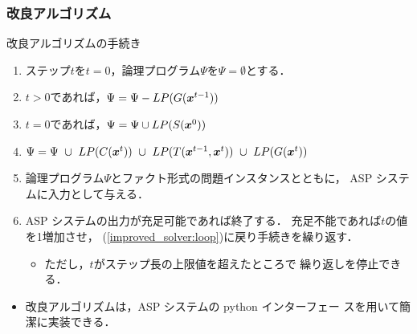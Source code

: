 \documentclass[dvipdfmx,11pt]{beamer}
\begin{document}
\begin{frame}\frametitle{改良アルゴリズム}

  \begin{block}{改良アルゴリズムの手続き}
    \begin{enumerate}
    \item ステップ$t$を$t=0$，論理プログラム$\Psi$を$\Psi = \emptyset$とする．
    \item $t>0$であれば，$\Psi = \Psi - LP(G(\bm{x}^{t-1}))$
      \label{improved_solver:loop}
    \item $t=0$であれば，$\Psi = \Psi \cup LP(S(\bm{x}^0))$
    \item $\Psi = \Psi \ \cup \ \enc{C(\bm{x}^{t})} \ \cup \ 
      \enc{T(\bm{x}^{t-1},\bm{x}^{t})} \ \cup \ \enc{G(\bm{x}^{t})}$
    \item 論理プログラム$\Psi$とファクト形式の問題インスタンスとともに，
      ASP システムに入力として与える．
    \item ASP システムの出力が充足可能であれば終了する．
      充足不能であれば$t$の値を1増加させ，
      (\ref{improved_solver:loop})に戻り手続きを繰り返す．
      \begin{itemize}
      \item ただし，$t$がステップ長の上限値を超えたところで
        繰り返しを停止できる．
      \end{itemize} \label{improved_solver:end}
    \end{enumerate}
  \end{block}

  \begin{itemize}
  \item 改良アルゴリズムは，ASP システム{\clingo}の python インターフェー
    スを用いて簡潔に実装できる．
  \end{itemize}

\end{frame}
\end{document}
